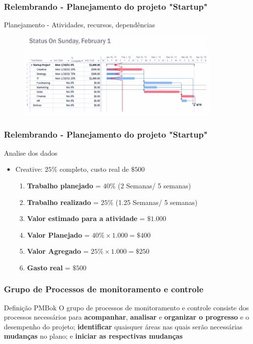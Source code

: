 \begin{frame}
 \frametitle{Relembrando - Planejamento do projeto "Startup"}
 Planejamento - Atividades, recursos, dependências
  \begin{figure}
   \centering
   \includegraphics[width = 0.9\textwidth]{figs/fig15.png}
  \end{figure}
\end{frame}

\begin{frame}
 \frametitle{Relembrando - Planejamento do projeto "Startup"}
Analise dos dados
  \begin{itemize}
   \item Creative: $25\%$ completo, custo real de $\$ 500$
   \begin{enumerate}
    \item \textbf{Trabalho planejado} = $40\%$ (2 Semanas/ 5 semanas)
    \item \textbf{Trabalho realizado} = $25\%$ (1.25 Semanas/ 5 semanas)
    \item \textbf{Valor estimado para a atividade} = $\$1.000$
    \item \textbf{Valor Planejado} = $40\% \times 1.000 = \$400$
    \item \textbf{Valor Agregado} =  $25\% \times 1.000 = \$250$
    \item  \textbf{Gasto real} = $\$500$
   \end{enumerate}

  \end{itemize}

\end{frame}

\begin{frame}
 \frametitle{Grupo de Processos de monitoramento e controle}
 \begin{block}{Definição PMBok}
 O grupo de processos de monitoramento e controle consiste dos processos necessários para \textbf{acompanhar},
\textbf{analisar} e \textbf{organizar o progresso} e o desempenho do projeto; \textbf{identificar} quaisquer áreas nas quais serão
necessárias \textbf{mudanças} no plano; e \textbf{iniciar as respectivas mudanças}
 \end{block}
\end{frame}

